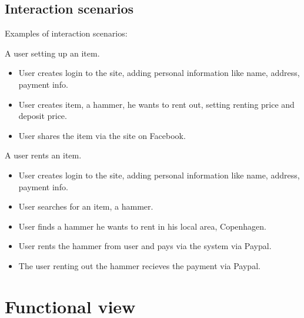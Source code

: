 \documentclass[a4paper,11pt]{report}
\begin{document}
\subsection{Interaction scenarios}
\label{sec:inter-scen}
Examples of interaction scenarios:

A user setting up an item.
\begin{itemize}
  \item User creates login to the site, adding personal information like name, address, payment info.
  \item User creates item, a hammer, he wants to rent out, setting renting price and deposit price.
  \item User shares the item via the site on Facebook.
\end{itemize}

A user rents an item.
\begin{itemize}
  \item User creates login to the site, adding personal information like name, address, payment info.
  \item User searches for an item, a hammer.
  \item User finds a hammer he wants to rent in his local area, Copenhagen.
  \item User rents the hammer from user and pays via the system via Paypal.
  \item The user renting out the hammer recieves the payment via Paypal.
\end{itemize}

\section{Functional view}
\label{sec:functional-view}

\begin{figure}
\label{fig:funcView}
\end{figure}
\end{document}
